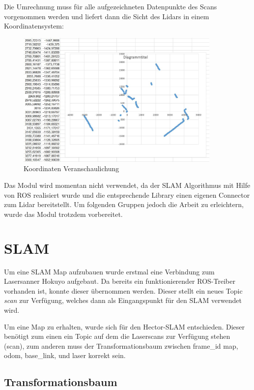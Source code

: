 Die Umrechnung muss für alle aufgezeichneten Datenpunkte des Scans vorgenommen werden und liefert dann die Sicht des Lidars in einem Koordinatensystem:

\begin{figure}[h]
\begin{center}
\includegraphics[width=10cm]{images/chapter5/kartKoord.jpg}
\caption{Koordinaten Veranschaulichung}
\label{Koordinaten_veranschaulichung}
\end{center}
\end{figure}




Das Modul wird momentan nicht verwendet, da der SLAM Algorithmus mit Hilfe von ROS realisiert wurde und die entsprechende Library einen eigenen Connector zum Lidar bereitstellt. Um folgenden Gruppen jedoch die Arbeit zu erleichtern, wurde das Modul trotzdem vorbereitet.



\section{SLAM}

Um eine SLAM Map aufzubauen wurde erstmal eine Verbindung zum Lasersanner Hokuyo aufgebaut. Da bereits ein funktionierender ROS-Treiber vorhanden ist, konnte dieser übernommen werden. Dieser stellt ein neues Topic \textit{scan} zur Verfügung, welches dann als Eingangspunkt für den SLAM verwendet wird. 

Um eine Map zu erhalten, wurde sich für den Hector-SLAM entschieden. Dieser benötigt zum einen ein Topic auf dem die Laserscans zur Verfügung stehen (scan), zum anderen muss der Transformationsbaum zwischen frame\_id map, odom, base\_link, und laser korrekt sein.  

\subsection{Transformationsbaum}

